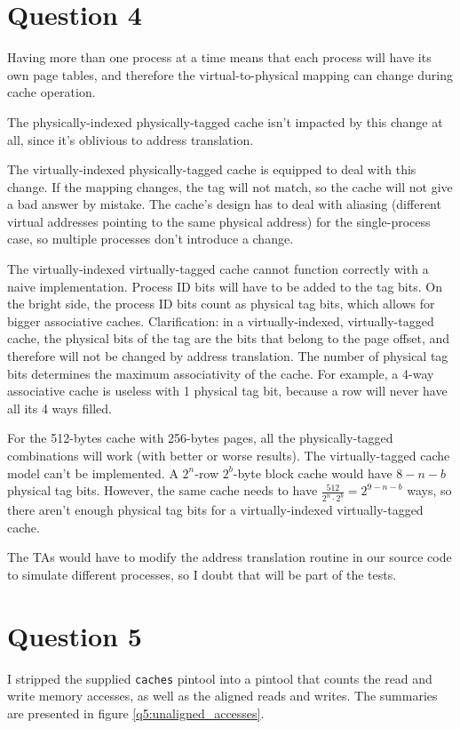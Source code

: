 \section{Question 4}
Having more than one process at a time means that each process will have its
own page tables, and therefore the virtual-to-physical mapping can change
during cache operation.

The physically-indexed physically-tagged cache isn't impacted by this change at
all, since it's oblivious to address translation.

The virtually-indexed physically-tagged cache is equipped to deal with this
change. If the mapping changes, the tag will not match, so the cache will not
give a bad answer by mistake. The cache's design has to deal with aliasing
(different virtual addresses pointing to the same physical address) for the
single-process case, so multiple processes don't introduce a change.

The virtually-indexed virtually-tagged cache cannot function correctly with a
naive implementation. Process ID bits will have to be added to the tag bits. On
the bright side, the process ID bits count as physical tag bits, which allows
for bigger associative caches. Clarification: in a virtually-indexed,
virtually-tagged cache, the physical bits of the tag are the bits that belong
to the page offset, and therefore will not be changed by address translation.
The number of physical tag bits determines the maximum associativity of the
cache. For example, a 4-way associative cache is useless with 1 physical tag
bit, because a row will never have all its 4 ways filled.

For the 512-bytes cache with 256-bytes pages, all the physically-tagged
combinations will work (with better or worse results). The virtually-tagged
cache model can't be implemented. A $2^n$-row $2^b$-byte block cache would have
$8 - n - b$ physical tag bits. However, the same cache needs to have
$\frac{512}{2^n \cdot 2^b} = 2^{9 - n - b}$ ways, so there aren't enough
physical tag bits for a virtually-indexed virtually-tagged cache.

The TAs would have to modify the address translation routine in our source code
to simulate different processes, so I doubt that will be part of the tests. 

\section{Question 5}

I stripped the supplied \texttt{caches} pintool into a pintool that counts the
read and write memory accesses, as well as the aligned reads and writes. The
summaries are presented in figure \ref{q5:unaligned_accesses}.

